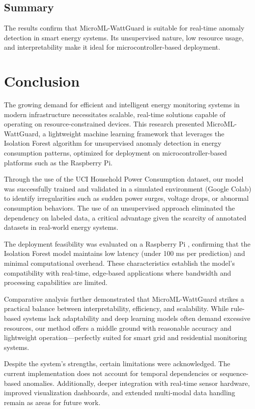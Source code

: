 \documentclass[12pt, draftclsnofoot, onecolumn]{IEEEtran}
\begin{document}
\subsection{Summary}

The results confirm that MicroML-WattGuard is suitable for real-time anomaly detection in smart energy systems. Its unsupervised nature, low resource usage, and interpretability make it ideal for microcontroller-based deployment.


\section{Conclusion}
The growing demand for efficient and intelligent energy monitoring systems in modern infrastructure necessitates scalable, real-time solutions capable of operating on resource-constrained devices. This research presented MicroML-WattGuard, a lightweight machine learning framework that leverages the Isolation Forest algorithm for unsupervised anomaly detection in energy consumption patterns, optimized for deployment on microcontroller-based platforms such as the Raspberry Pi.

Through the use of the UCI Household Power Consumption dataset, our model was successfully trained and validated in a simulated environment (Google Colab) to identify irregularities such as sudden power surges, voltage drops, or abnormal consumption behaviors. The use of an unsupervised approach eliminated the dependency on labeled data, a critical advantage given the scarcity of annotated datasets in real-world energy systems.

The deployment feasibility was evaluated on a Raspberry Pi , confirming that the Isolation Forest model maintains low latency (under 100 ms per prediction) and minimal computational overhead. These characteristics establish the model’s compatibility with real-time, edge-based applications where bandwidth and processing capabilities are limited.

Comparative analysis further demonstrated that MicroML-WattGuard strikes a practical balance between interpretability, efficiency, and scalability. While rule-based systems lack adaptability and deep learning models often demand excessive resources, our method offers a middle ground with reasonable accuracy and lightweight operation—perfectly suited for smart grid and residential monitoring systems.

Despite the system’s strengths, certain limitations were acknowledged. The current implementation does not account for temporal dependencies or sequence-based anomalies. Additionally, deeper integration with real-time sensor hardware, improved visualization dashboards, and extended multi-modal data handling remain as areas for future work.
\end{document}
